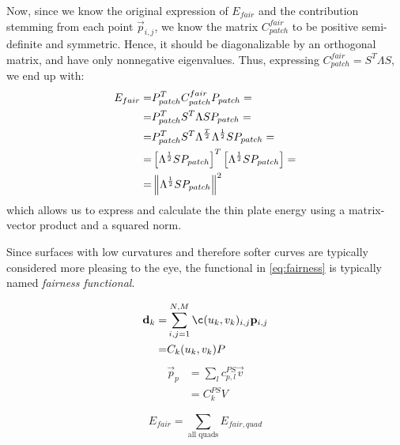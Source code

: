 Now, since we know the original expression of $E_{fair}$ and the contribution stemming from each point $\vec{p}_{i,j}$, we know the matrix $C_{patch}^{fair}$ to be positive semi-definite and symmetric. Hence, it should be diagonalizable by an orthogonal matrix, and have only nonnegative eigenvalues. Thus, expressing $C_{patch}^{fair} = S^T \Lambda S$, we end up with:
\begin{align}
E_{fair} =& P_{patch}^T C_{patch}^{fair} P_{patch} =\nonumber
\\
=&  P_{patch}^T S^T \Lambda S P_{patch} = \nonumber
\\
=& P_{patch}^T S^T \Lambda^{\frac{T}{2}}\Lambda^{\frac{1}{2}} S P_{patch} = \nonumber
\\
=& \left[\Lambda^{\frac{1}{2}} S P_{patch}\right]^T\left[\Lambda^{\frac{1}{2}} S P_{patch}\right] =\nonumber
\\
=& \norm{\Lambda^{\frac{1}{2}} S P_{patch}}^2
\label{eq:fairnessnorm}
\end{align}
which allows us to express and calculate the thin plate energy using a matrix-vector product and a squared norm.

Since surfaces with low curvatures and therefore softer curves are typically considered more pleasing to the eye, the functional in \autoref{eq:fairness} is typically named \emph{fairness functional}.


\begin{align}
\vec{d}_k = & \sum\limits_{i,j=1}^{N,M} \c(u_k,v_k)_{i,j} \lsControlPointi{i,j}
\\=& C_k (u_k,v_k)P
\end{align}
\begin{align}
\vec{p}_{p} &= \sum\limits_{l} c^{PS}_{p,l} \vec{v} 
\\
&=C_k^{PS}V
\end{align}



\begin{equation}
\label{eq:fairness-sum}
E_{fair} = \sum\limits_{\text{all quads}}E_{fair,quad}
\end{equation}



